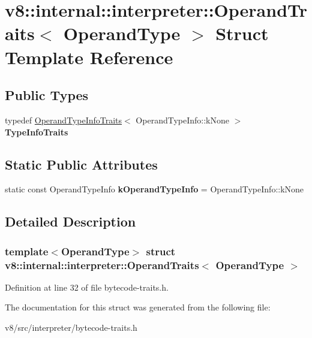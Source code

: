 \hypertarget{structv8_1_1internal_1_1interpreter_1_1OperandTraits}{}\section{v8\+:\+:internal\+:\+:interpreter\+:\+:Operand\+Traits$<$ Operand\+Type $>$ Struct Template Reference}
\label{structv8_1_1internal_1_1interpreter_1_1OperandTraits}
\subsection*{Public Types}
\begin{DoxyCompactItemize}
\item 
\mbox{\label{structv8_1_1internal_1_1interpreter_1_1OperandTraits_a97d56b2984c1e928e0921b92cb43b52e}} 
typedef \mbox{\hyperlink{structv8_1_1internal_1_1interpreter_1_1OperandTypeInfoTraits}{Operand\+Type\+Info\+Traits}}$<$ Operand\+Type\+Info\+::k\+None $>$ {\bfseries Type\+Info\+Traits}
\end{DoxyCompactItemize}
\subsection*{Static Public Attributes}
\begin{DoxyCompactItemize}
\item 
\mbox{\label{structv8_1_1internal_1_1interpreter_1_1OperandTraits_a63e46b265551cd2d94d4cec655898a74}} 
static const Operand\+Type\+Info {\bfseries k\+Operand\+Type\+Info} = Operand\+Type\+Info\+::k\+None
\end{DoxyCompactItemize}


\subsection{Detailed Description}
\subsubsection*{template$<$Operand\+Type$>$\newline
struct v8\+::internal\+::interpreter\+::\+Operand\+Traits$<$ Operand\+Type $>$}



Definition at line 32 of file bytecode-\/traits.\+h.



The documentation for this struct was generated from the following file\+:\begin{DoxyCompactItemize}
\item 
v8/src/interpreter/bytecode-\/traits.\+h\end{DoxyCompactItemize}
